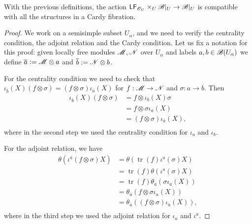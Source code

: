 \begin{theorem}\label{action_cy}
With the previous definitions, the action $\mathsf{LF}_{\mathscr{O}_U}\times_U\mathscr{B}|_U\to \mathscr{B}|_U$ is compatible with all the structures in a Cardy fibration. 
\end{theorem}
\begin{proof}
We work on a semisimple subset $U_\alpha$, and we need to verify the centrality condition, the adjoint relation and the Cardy condition. Let us fix a notation for this proof: given locally free modules $\mathscr{M},\mathscr{N}$ over $U_\alpha$ and labels $a,b\in \mathscr{B}(U_\alpha )$ we define $\overline{a}:=\mathscr{M}\otimes a$ and $\overline{b}:=\mathscr{N}\otimes b$.

For the centrality condition we need to check that $\iota_{\overline{b}}(X)(f\otimes \sigma )=(f\otimes \sigma )\iota_{\overline{a}}(X)$ for $f:\mathscr{M}\to \mathscr{N}$ and $\sigma :a\to b$. Then
$$
\begin{aligned}
\iota_{\overline{b}}(X)(f\otimes \sigma ) &= f\otimes \iota_b(X)\sigma \\
                                          &= f\otimes \sigma \iota_a(X) \\
                                          &= (f\otimes \sigma )\iota_{\overline{a}}(X), \\
\end{aligned}
$$
where in the second step we used the centrality condition for $\iota_a$ and $\iota_b$.

For the adjoint relation, we have
$$
\begin{aligned}
\theta (\iota^{\overline{a}}(f\otimes \sigma )X) &= \theta (\operatorname{tr}(f)\iota^a(\sigma )X) \\
&= \operatorname{tr}(f)\theta (\iota^a(\sigma )X) \\
&= \operatorname{tr}(f)\theta_a(\sigma \iota_a(X)) \\
&= \theta_{\overline{a}}(f\otimes \sigma \iota_a(X))\\
&= \theta_{\overline{a}}((f\otimes \sigma )\iota_{\overline{a}}(X)),\\
\end{aligned}
$$
where in the third step we used the adjoint relation for $\iota_a$ and $\iota^a$.


\end{proof}
